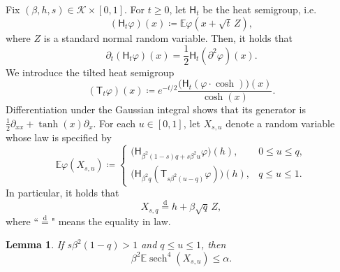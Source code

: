 \documentclass[11pt]{article}
\newtheorem{lemma}[theorem]{Lemma}
\numberwithin{equation}{section}
\newcommand{\E}{\mathbb{E}}
\newcommand{\1}{\mathbf 1}
\newcommand{\sech}{\operatorname{sech}}
\newcommand{\cK}{\mathcal K}
\begin{document}
Fix $(\beta,h,s)\in\cK\times[0,1]$.
For $t\ge0$, let $\mathsf H_t$ be the heat semigroup, i.e. 
\[
 (\mathsf H_t\varphi)(x)\coloneqq\E\varphi(x+\sqrt t\,Z),
\]
where $Z$ is a standard normal random variable.
Then, it holds that
\begin{equation}\label{eq:genH}
\partial _t (\mathsf H_t\varphi)(x) = \frac{1}{2} \mathsf H_t (\partial ^2 \varphi)(x) .
\end{equation}
We introduce the tilted heat semigroup
\begin{equation}
 (\mathsf T_t\varphi)(x)
 \coloneqq e^{-t/2}
 \frac{\bigl(\mathsf H_t
   (\varphi \cdot \cosh )\bigr)(x)}{\cosh(x)}.
 \label{eq:tiltedsemigroup}
\end{equation}
Differentiation under the Gaussian integral shows that its generator is
$\frac12\partial_{xx}+\tanh(x)\partial_x$.  For each $u\in[0,1]$,
let $X_{s,u}$ denote a random variable whose law is specified by
\begin{equation}
 \E\varphi(X_{s,u})
 \coloneqq
 \begin{cases}
  \bigl(\mathsf H_{\beta^2(1-s)q+s\beta^2u}\varphi\bigr)(h),
      &0\le u\le q,\\[1mm]
  \bigl(\mathsf H_{\beta^2q}
      (\mathsf T_{s\beta^2(u-q)}\varphi)\bigr)(h),
      &q\le u\le1.
 \end{cases}
 \label{eq:localfieldlaw}
\end{equation}
In particular, it holds that
\begin{equation}\label{eq:Xsq}
X_{s,q}\stackrel{\mathrm d}=h+\beta\sqrt q\,Z,
\end{equation}
where ``$\stackrel{\mathrm d}=$" means the equality in law.

\begin{lemma}
\label{lem:uppercomparison}
If $s\beta^2(1-q)>1$ and $q\le u\le1$, then
\begin{equation}
 \beta^2\mathbb{E}\sech^4(X_{s,u})\le\alpha.
 \label{eq:uppercomparison}
\end{equation}
\end{lemma}
\end{document}
